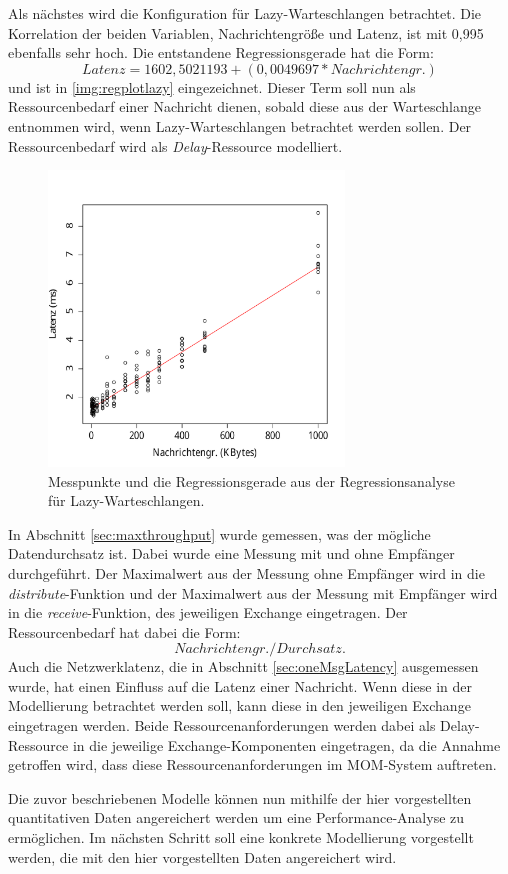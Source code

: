 Als nächstes wird die Konfiguration für Lazy-Warteschlangen betrachtet. Die Korrelation der beiden Variablen, Nachrichtengröße und Latenz, ist mit 0,995 ebenfalls sehr hoch. Die entstandene Regressionsgerade hat die Form: \[Latenz = 1602,5021193 + (0,0049697 * Nachrichtengr.)\] und ist in \autoref{img:regplotlazy} eingezeichnet. Dieser Term soll nun als Ressourcenbedarf einer Nachricht dienen, sobald diese aus der Warteschlange entnommen wird, wenn Lazy-Warteschlangen betrachtet werden sollen. Der Ressourcenbedarf wird als \emph{Delay}-Ressource modelliert.
\begin{figure}
\center
  \includegraphics[width=0.7\textwidth]{images/modelling/oneMsgLazyRegression.pdf}
  \caption{Messpunkte und die Regressionsgerade aus der Regressionsanalyse für Lazy-Warteschlangen.}
  \label{img:regplotlazy}
\end{figure}

In Abschnitt \ref{sec:maxthroughput} wurde gemessen, was der mögliche Datendurchsatz ist. Dabei wurde eine Messung mit und ohne Empfänger durchgeführt. Der Maximalwert aus der Messung ohne Empfänger wird in die \emph{distribute}-Funktion und der Maximalwert aus der Messung mit Empfänger wird in die \emph{receive}-Funktion, des jeweiligen Exchange eingetragen. Der Ressourcenbedarf hat dabei die Form: \[Nachrichtengr. /  Durchsatz.\]
Auch die Netzwerklatenz, die in Abschnitt \ref{sec:oneMsgLatency} ausgemessen wurde, hat einen Einfluss auf die Latenz einer Nachricht. Wenn diese in der Modellierung betrachtet werden soll, kann diese in den jeweiligen Exchange eingetragen werden. Beide Ressourcenanforderungen werden dabei als Delay-Ressource in die jeweilige Exchange-Komponenten eingetragen, da die Annahme getroffen wird, dass diese Ressourcenanforderungen im MOM-System auftreten. \par
Die zuvor beschriebenen Modelle können nun mithilfe der hier vorgestellten quantitativen Daten angereichert werden um eine Performance-Analyse zu ermöglichen. Im nächsten Schritt soll eine konkrete Modellierung vorgestellt werden, die mit den hier vorgestellten Daten angereichert wird. 

